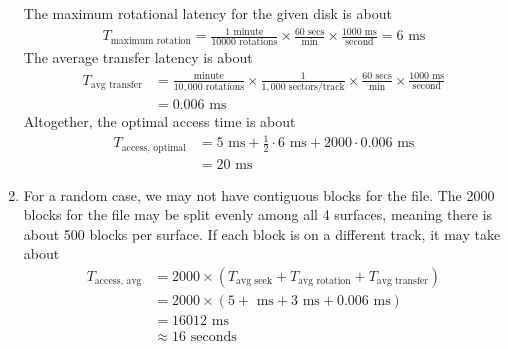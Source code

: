 \documentclass[12pt]{article}
\newenvironment{sol}[1][Solution]{\begin{trivlist}
		\item[\hskip \labelsep {\bfseries #1:}]}{\end{trivlist}}
\begin{document}
\begin{sol}
\begin{enumerate}[label=(\alph*)]
		The maximum rotational latency for the given disk is about
		\begin{align*}
			T_{\text{maximum rotation}}
			=
			 \frac{1 \text{ minute}}{10000 \text{ rotations}}
			\times \frac{60 \text{ secs}}{\text{min}}
			\times \frac{1000 \text{ ms}}{\text{second}}
			=6\text{ ms}
		\end{align*}
		The average transfer latency is about
		\begin{align*}
			T_{\text{avg transfer}}
			&=\frac{\text{minute}}{10,000 \text{ rotations}}
			\times \frac{1}{1,000 \text{ sectors/track}}
			\times \frac{60 \text{ secs}}{\text{min}}
			\times \frac{1000 \text{ ms}}{\text{second}}\\
			&=0.006\text{ ms}
		\end{align*}
		Altogether, the optimal access time is about
		\begin{align*}
			T_{\text{access, optimal}}
			&=5\text{ ms} + \frac{1}{2} \cdot 6 \text{ ms} + 2000\cdot 0.006\text{ ms}\\
			&=20\text{ ms}
		\end{align*}
		\item For a random case, we may not have contiguous blocks for the file. The 2000
		blocks for the file may be split evenly among all 4 surfaces, meaning there is about
		500 blocks per surface. If each block is on a different track, it may take about
		\begin{align*}
			T_{\text{access, avg}}&=
			2000\times \left( T_{\text{avg seek}} + T_{\text{avg rotation}} + T_{\text{avg
					transfer}}\right)\\
			&=2000\times (5 + \text{ ms} + 3 \text{ ms} + 0.006\text{ ms})\\
			&=16012\text{ ms}\\
			&\approx 16 \text{ seconds}
		\end{align*}
	\end{enumerate}
\end{sol}
\end{document}
